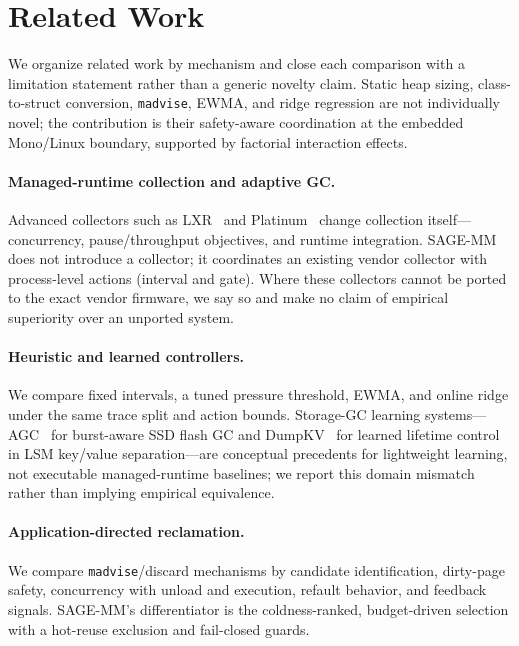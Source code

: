 \documentclass[acmsmall,screen]{acmart}
\begin{document}
\section{Related Work}
\label{sec:related}

We organize related work by mechanism and close each comparison with a
limitation statement rather than a generic novelty claim. Static heap
sizing, class-to-struct conversion, \texttt{madvise}, EWMA, and ridge
regression are not individually novel; the contribution is their
safety-aware coordination at the embedded Mono/Linux boundary, supported by
factorial interaction effects.

\paragraph{Managed-runtime collection and adaptive GC.}
Advanced collectors such as LXR~\cite{lxr2022} and
Platinum~\cite{platinum2020} change collection itself---concurrency,
pause/throughput objectives, and runtime integration. SAGE-MM does not
introduce a collector; it coordinates an existing vendor collector with
process-level actions (interval and gate). Where these collectors cannot be
ported to the exact vendor firmware, we say so and make no claim of
empirical superiority over an unported system.

\paragraph{Heuristic and learned controllers.}
We compare fixed intervals, a tuned pressure threshold, EWMA, and online
ridge under the same trace split and action bounds. Storage-GC learning
systems---AGC~\cite{agc2025} for burst-aware SSD flash GC and
DumpKV~\cite{dumpkv2024} for learned lifetime control in LSM key/value
separation---are conceptual precedents for lightweight learning, not
executable managed-runtime baselines; we report this domain mismatch rather
than implying empirical equivalence.

\paragraph{Application-directed reclamation.}
We compare \texttt{madvise}/discard mechanisms by candidate identification,
dirty-page safety, concurrency with unload and execution, refault behavior,
and feedback signals. SAGE-MM's differentiator is the coldness-ranked,
budget-driven selection with a hot-reuse exclusion and fail-closed guards.
\end{document}
